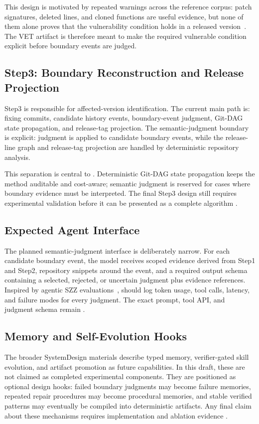 This design is motivated by repeated warnings across the reference corpus: patch signatures, deleted lines, and cloned functions are useful evidence, but none of them alone proves that the vulnerability condition holds in a released version~\cite{vszz2022,redebug2012,vuddy2017,movery2022,vercation2026}. The VET artifact is therefore meant to make the required vulnerable condition explicit before boundary events are judged.

\subsection{Step3: Boundary Reconstruction and Release Projection}

Step3 is responsible for affected-version identification. The current main path is: fixing commits, candidate history events, boundary-event judgment, Git-DAG state propagation, and release-tag projection.
The semantic-judgment boundary is explicit: judgment is applied to candidate boundary events, while the release-line graph and release-tag projection are handled by deterministic repository analysis.

This separation is central to \toolname. Deterministic Git-DAG state propagation keeps the method auditable and cost-aware; semantic judgment is reserved for cases where boundary evidence must be interpreted. The final Step3 design still requires experimental validation before it can be presented as a complete algorithm .

\subsection{Expected Agent Interface}

The planned semantic-judgment interface is deliberately narrow. For each candidate boundary event, the model receives scoped evidence derived from Step1 and Step2, repository snippets around the event, and a required output schema containing a selected, rejected, or uncertain judgment plus evidence references. Inspired by agentic SZZ evaluations~\cite{agentszz2026,howwhyagents2026}, \toolname should log token usage, tool calls, latency, and failure modes for every judgment. The exact prompt, tool API, and judgment schema remain .

\subsection{Memory and Self-Evolution Hooks}

The broader SystemDesign materials describe typed memory, verifier-gated skill evolution, and artifact promotion as future capabilities. In this draft, these are not claimed as completed experimental components. They are positioned as optional design hooks: failed boundary judgments may become failure memories, repeated repair procedures may become procedural memories, and stable verified patterns may eventually be compiled into deterministic artifacts. Any final claim about these mechanisms requires implementation and ablation evidence .
